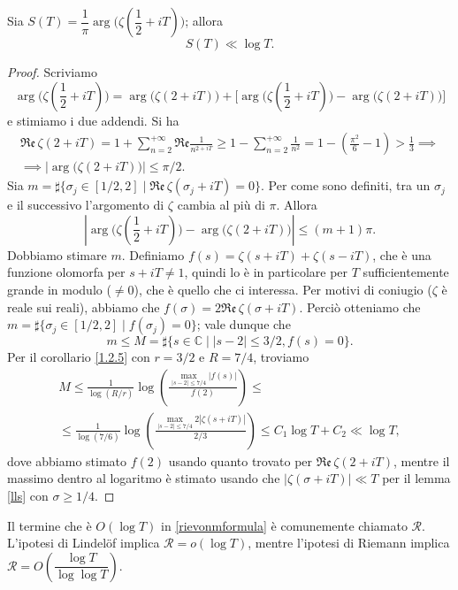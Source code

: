 \begin{lm}
  Sia $S(T)=\dfrac{1}{\pi}\arg\Bigg(\zeta\left(\dfrac{1}{2}+iT\right)\Bigg)$; allora
  $$S(T) \ll \log{T}.$$
\end{lm}

\begin{proof}
  Scriviamo $$\arg\Bigg(\zeta\left(\frac{1}{2}+iT\right)\Bigg)=\arg\big(\zeta(2+iT)\big)+\Bigg[\arg\Bigg(\zeta\left(\frac{1}{2}+iT\right)\Bigg)-\arg\big(\zeta(2+iT)\big)\Bigg]$$
  e stimiamo i due addendi. Si ha
  \begin{gather*}
    \mathfrak{Re}\,\zeta(2+iT)=1+\sum_{n=2}^{+\infty} \mathfrak{Re}\frac{1}{n^{2+iT}} \ge 1-\sum_{n=2}^{+\infty} \frac{1}{n^2}=1-\left(\frac{\pi^2}{6}-1\right)>\frac{1}{3} \implies \\
    \implies |\arg\big(\zeta(2+iT)\big)| \le \pi/2.
  \end{gather*}
  Sia $m=\sharp\{\sigma_j \in [1/2,2] \mid \mathfrak{Re}\,\zeta(\sigma_j+iT)=0\}$.
  Per come sono definiti, tra un $\sigma_j$ e il successivo l'argomento di $\zeta$ cambia al più di $\pi$. Allora
  $$\left|\arg\Bigg(\zeta\left(\frac{1}{2}+iT\right)\Bigg)-\arg\big(\zeta(2+iT)\big)\right| \le (m+1)\pi.$$
  Dobbiamo stimare $m$. Definiamo $f(s)=\zeta(s+iT)+\zeta(s-iT)$, che è una funzione olomorfa per $s+iT\not=1$, quindi lo è in particolare per $T$ sufficientemente grande in modulo ($\not=0$), che è quello che ci interessa. Per motivi di coniugio ($\zeta$ è reale sui reali), abbiamo che $f(\sigma)=2\mathfrak{Re}\,\zeta(\sigma+iT)$. Perciò otteniamo che $m=\sharp\{\sigma_j \in [1/2,2] \mid f(\sigma_j)=0\}$; vale dunque che
  $$m \le M=\sharp\{s \in \mathbb{C} \mid |s-2| \le 3/2, f(s)=0\}.$$
  Per il corollario \ref{1.2.5} con $r=3/2$ e $R=7/4$, troviamo
  \begin{gather*}
    M \le \frac{1}{\log(R/r)}\log\left(\frac{\max_{|s-2| \le 7/4}|f(s)|}{f(2)}\right) \le \\
    \le \frac{1}{\log(7/6)}\log\left(\frac{\max_{|s-2| \le 7/4} 2|\zeta(s+iT)|}{2/3}\right) \le C_1\log{T}+C_2 \ll \log{T},
  \end{gather*}
  dove abbiamo stimato $f(2)$ usando quanto trovato per $\mathfrak{Re}\,\zeta(2+iT)$, mentre il massimo dentro al logaritmo è stimato usando che $|\zeta(\sigma+iT)| \ll T$ per il lemma \ref{lls} con $\sigma \ge 1/4$.
\end{proof}

\begin{ftt}
  Il termine che è $O(\log{T})$ in \eqref{rievonmformula} è comunemente chiamato $\mathcal{R}$. L'ipotesi di Lindelöf implica $\mathcal{R}=o(\log{T})$, mentre l'ipotesi di Riemann implica $\mathcal{R}=O\left(\dfrac{\log{T}}{\log{\log{T}}}\right)$.
\end{ftt}
